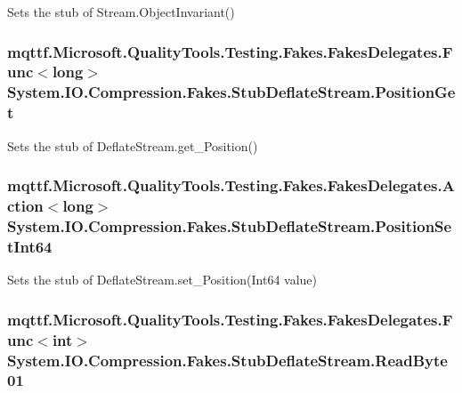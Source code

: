 Sets the stub of Stream.\-Object\-Invariant()

\hypertarget{class_system_1_1_i_o_1_1_compression_1_1_fakes_1_1_stub_deflate_stream_aa6d38831b7508cb17c8cf2494a6d6e88}{
\subsubsection[{Position\-Get}]{\setlength{\rightskip}{0pt plus 5cm}mqttf.\-Microsoft.\-Quality\-Tools.\-Testing.\-Fakes.\-Fakes\-Delegates.\-Func$<$long$>$ System.\-I\-O.\-Compression.\-Fakes.\-Stub\-Deflate\-Stream.\-Position\-Get}}\label{class_system_1_1_i_o_1_1_compression_1_1_fakes_1_1_stub_deflate_stream_aa6d38831b7508cb17c8cf2494a6d6e88}


Sets the stub of Deflate\-Stream.\-get\-\_\-\-Position()

\hypertarget{class_system_1_1_i_o_1_1_compression_1_1_fakes_1_1_stub_deflate_stream_a498ce6a2c5dd4f552aec94b34feddc5a}{
\subsubsection[{Position\-Set\-Int64}]{\setlength{\rightskip}{0pt plus 5cm}mqttf.\-Microsoft.\-Quality\-Tools.\-Testing.\-Fakes.\-Fakes\-Delegates.\-Action$<$long$>$ System.\-I\-O.\-Compression.\-Fakes.\-Stub\-Deflate\-Stream.\-Position\-Set\-Int64}}\label{class_system_1_1_i_o_1_1_compression_1_1_fakes_1_1_stub_deflate_stream_a498ce6a2c5dd4f552aec94b34feddc5a}


Sets the stub of Deflate\-Stream.\-set\-\_\-\-Position(\-Int64 value)

\hypertarget{class_system_1_1_i_o_1_1_compression_1_1_fakes_1_1_stub_deflate_stream_ae927177e79419b818b19b6846ecbe928}{
\subsubsection[{Read\-Byte01}]{\setlength{\rightskip}{0pt plus 5cm}mqttf.\-Microsoft.\-Quality\-Tools.\-Testing.\-Fakes.\-Fakes\-Delegates.\-Func$<$int$>$ System.\-I\-O.\-Compression.\-Fakes.\-Stub\-Deflate\-Stream.\-Read\-Byte01}}\label{class_system_1_1_i_o_1_1_compression_1_1_fakes_1_1_stub_deflate_stream_ae927177e79419b818b19b6846ecbe928}


